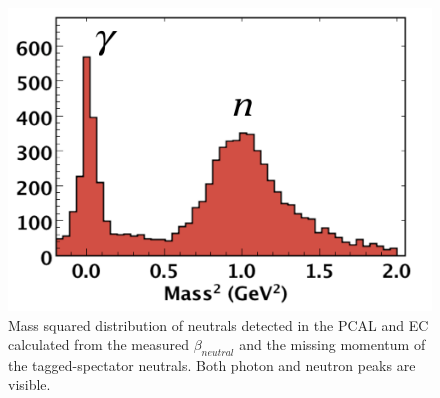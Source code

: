 \begin{figure}[h]
\centering
\includegraphics[width=1.0\columnwidth,keepaspectratio]{img/S10_4_3.png}
\caption[]{Mass squared distribution of neutrals detected in the PCAL and EC calculated from the measured
  $\beta_{neutral}$ and the missing momentum of the tagged-spectator neutrals. Both photon and neutron peaks
  are visible.}
\label{fig:S10_4_3}
\end{figure}
